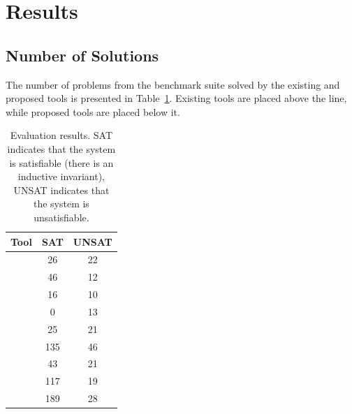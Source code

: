\section{Results}

\subsection{Number of Solutions}

The number of problems from the benchmark suite solved by the existing and proposed tools is presented in Table~\ref{table:eval-all}.
Existing tools are placed above the line, while proposed tools are placed below it.
\begin{table}[t]
    \caption{Evaluation results. SAT indicates that the system is satisfiable (there is an inductive invariant), UNSAT indicates that the system is unsatisfiable.}
    \label{table:eval-all}
    \small
    \centering
    \begin{tabular}{ |l||c|c| }
    \hline\hline
    Tool & SAT & UNSAT\\\hline\hline
    \racer{} & 26 & 22\\
    \eldarica{} & 46 & 12\\
    \vericat{} & 16 & 10\\
    \cvcind{} & 0 & 13\\
    \hline
    \ringen{\cvc{}} & 25 & 21\\
    \ringen{\vampire{}} & 135 & 46\\
    \ringenSync{} & 43 & 21\\
    \ringenCICI{\cvc{}} & 117 & 19\\
    \ringenCICI{\vampire{}} & 189 & 28\\
    \hline\hline
    \end{tabular}
\end{table}

